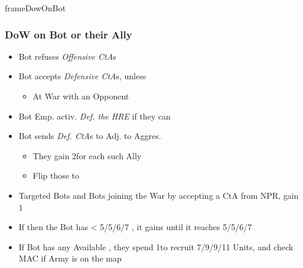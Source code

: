 \documentclass[10pt]{article}
\newlength{\fhDowOnBot} \setlength\fhDowOnBot{9\baselineskip}
\begin{document}
\begin{dynamiccontents*}{frameDowOnBot}\begin{eubox}[botrulescolor]{\fhDowOnBot}
	{\botrules
	\begin{multicols}{2}
		\subsubsection*{DoW on Bot or their Ally }
		\begin{itemize}
			\item Bot refuses \emph{Offensive CtA}s
			\item Bot accepts \emph{Defensive CtA}s, unless
			\begin{itemize}
				\item At War with an Opponent
			\end{itemize}
			\item Bot Emp. activ. \emph{Def. the HRE} if they can
			\item Bot sends \emph{Def. CtA}s to \allies Adj. to Aggres.
			\begin{itemize}
				\item They gain 2\botpower for each such Ally
				\item Flip those \alliances to \activeallies
			\end{itemize}
		\end{itemize}
		\columnbreak
		\begin{itemize}
			\item Targeted Bots and Bots joining the War by accepting a CtA from NPR, gain 1\botpower
			\item If then the Bot has < 5/5/6/7 \botpower, it gains \botpower until it reaches 5/5/6/7
			\item If Bot has any Available \manpower, they spend 1\botpower to recruit 7/9/9/11 Units, and check MAC if Army is on the map
		\end{itemize}
	\end{multicols}
  }
\end{eubox}\end{dynamiccontents*}
\end{document}
